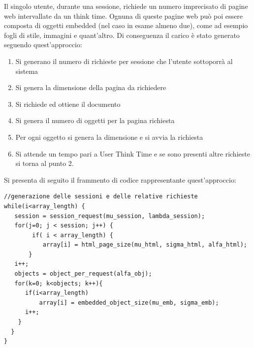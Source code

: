 Il singolo utente, durante una sessione, richiede un numero imprecisato di pagine web intervallate da un think time. Ognuna di queste pagine web può poi essere composta di oggetti embedded (nel caso in esame almeno due), come ad esempio fogli di stile, immagini e quant'altro. Di conseguenza il carico è stato generato seguendo quest'approccio:
\begin{enumerate}
	\item Si generano il numero di richieste per sessione che l'utente sottoporrà al sistema
	\item Si genera la dimensione della pagina da richiedere
	\item Si richiede ed ottiene il documento
	\item Si genera il numero di oggetti per la pagina richiesta
	\item Per ogni oggetto si genera la dimensione e si avvia la richiesta
	\item Si attende un tempo pari a User Think Time e se sono presenti altre richieste si torna al punto 2.
\end{enumerate}
Si presenta di seguito il frammento di codice rappresentante quest'approccio:
\begin{lstlisting}
//generazione delle sessioni e delle relative richieste 
while(i<array_length) { 
   session = session_request(mu_session, lambda_session); 
   for(j=0; j < session; j++) { 
        if( i < array_length) { 
           array[i] = html_page_size(mu_html, sigma_html, alfa_html); 	
       } 
   i++; 
   objects = object_per_request(alfa_obj); 
   for(k=0; k<objects; k++){ 
      if(i<array_length) 
          array[i] = embedded_object_size(mu_emb, sigma_emb); 
      i++; 
    } 
  } 
}
\end{lstlisting}

